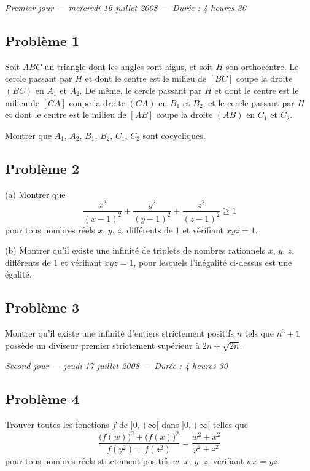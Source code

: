 
\begin{center}
  \emph{Premier jour --- mercredi 16 juillet 2008 --- Durée : 4 heures 30}
\end{center}

\subsection*{Problème 1}
Soit $ABC$ un triangle dont les angles sont aigus, et soit $H$ son orthocentre. Le cercle passant par $H$ et
dont le centre est le milieu de $[BC]$ coupe la droite $(BC)$ en $A_1$ et $A_2$. De même, le cercle passant par
$H$ et dont le centre est le milieu de $[CA]$ coupe la droite $(CA)$ en $B_1$ et $B_2$, et le cercle passant
par $H$ et dont le centre est le milieu de $[AB]$ coupe la droite $(AB)$ en $C_1$ et $C_2$.

Montrer que $A_1$, $A_2$, $B_1$, $B_2$, $C_1$, $C_2$ sont cocycliques.

\subsection*{Problème 2}
(a) Montrer que
\[
\frac{x^2}{(x-1)^2} + \frac{y^2}{(y-1)^2} + \frac{z^2}{(z-1)^2} \geqslant 1
\]
pour tous nombres réels $x$, $y$, $z$, différents de $1$ et vérifiant $xyz = 1$.

(b) Montrer qu'il existe une infinité de triplets de nombres rationnels $x$, $y$, $z$, différents de $1$ et
vérifiant $xyz = 1$, pour lesquels l'inégalité ci-dessus est une égalité.

\subsection*{Problème 3}
Montrer qu'il existe une infinité d'entiers strictement positifs $n$ tels que $n^2 + 1$ possède un diviseur
premier strictement supérieur à $2n + \sqrt{2n}$.

\bigskip
\begin{center}
  \emph{Second jour --- jeudi 17 juillet 2008 --- Durée : 4 heures 30}
\end{center}

\subsection*{Problème 4}
Trouver toutes les fonctions $f$ de $]0, +\infty[$ dans $]0, +\infty[$ telles que
\[
\frac{\bigl(f(w)\bigr)^2 + \bigl(f(x)\bigr)^2}{f(y^2) + f(z^2)} = \frac{w^2 + x^2}{y^2 + z^2}
\]
pour tous nombres réels strictement positifs $w$, $x$, $y$, $z$, vérifiant $wx = yz$.

